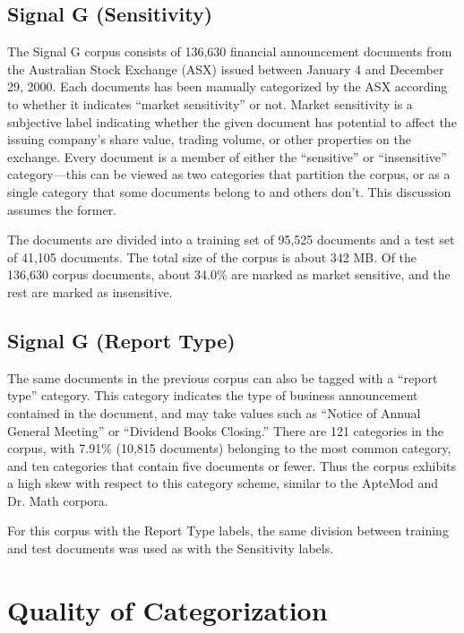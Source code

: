 \subsection{Signal G (Sensitivity)}

The Signal G corpus consists of 136,630 financial announcement
documents from the Australian Stock Exchange (ASX)\cite{asx:02} issued
between January 4 and December 29, 2000.  Each documents has been
manually categorized by the ASX according to whether it indicates ``market
sensitivity'' or not.  Market sensitivity is a subjective label indicating
whether the given document has potential to affect the issuing
company's share value, trading volume, or other properties on the
exchange.  Every document is a member of either the ``sensitive'' or
``insensitive'' category---this can be viewed as two categories that
partition the corpus, or as a single category that some documents
belong to and others don't.  This discussion assumes the former.

The documents are divided into a training set of 95,525 documents and a
test set of 41,105 documents.  The total size of the corpus is about
342 MB.  Of the 136,630 corpus documents, about 34.0\% are marked as
market sensitive, and the rest are marked as insensitive.

\subsection{Signal G (Report Type)}

The same documents in the previous corpus can also be tagged with a
``report type'' category.  This category indicates the type of
business announcement contained in the document, and may take values
such as ``Notice of Annual General Meeting'' or ``Dividend Books
Closing.''  There are 121 categories in the corpus, with 7.91\%
(10,815 documents) belonging to the most common category, and ten
categories that contain five documents or fewer.  Thus the corpus
exhibits a high skew with respect to this category scheme, similar to
the ApteMod and Dr. Math corpora.

For this corpus with the Report Type labels, the same division between
training and test documents was used as with the Sensitivity labels.



\section{Quality of Categorization}
\label{Quality}

